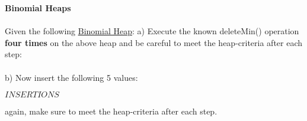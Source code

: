 \textbf{\LARGE{\color{tumgadRed}Binomial Heaps}}\\
\\
\noindent
Given the following
\href{https://ossner.github.io/TUMGAD/src/DataStructures/PriorityQueues/BinomialHeaps/BinomialHeaps}{\underline{Binomial Heap}}:
a) Execute the known deleteMin() operation \textbf{four times} on the above heap and be careful to meet the heap-criteria after each step:\\
\newline
\\
\newline
b) Now insert the following 5 values:
\begin{center}
    $INSERTIONS$
\end{center}
again, make sure to meet the heap-criteria after each step.\\
\newline
